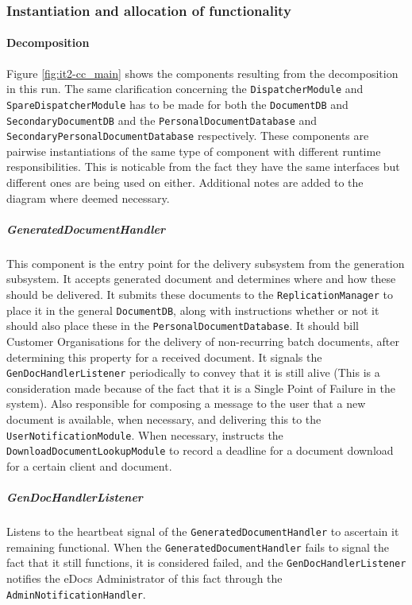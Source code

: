 \documentclass[a4paper,10pt]{article}
\begin{document}
\subsubsection{Instantiation and allocation of functionality}
\paragraph{Decomposition}
Figure \ref{fig:it2-cc_main} shows the components resulting from the decomposition in this run. The same clarification concerning the \texttt{DispatcherModule} and \texttt{SpareDispatcherModule} has to be made for both the \texttt{DocumentDB} and \texttt{SecondaryDocumentDB} and the \texttt{PersonalDocumentDatabase} and \texttt{SecondaryPersonalDocumentDatabase} respectively. These components are pairwise instantiations of the same type of component with different runtime responsibilities. This is noticable from the fact they have the same interfaces but different ones are being used on either. Additional notes are added to the diagram where deemed necessary.

\subparagraph{GeneratedDocumentHandler}
This component is the entry point for the delivery subsystem from the generation subsystem. It accepts generated document and determines where and how these should be delivered. It submits these documents to the \texttt{ReplicationManager} to place it in the general \texttt{DocumentDB}, along with instructions whether or not it should also place these in the \texttt{PersonalDocumentDatabase}. It should bill Customer Organisations for the delivery of non-recurring batch documents, after determining this property for a received document. It signals the \texttt{GenDocHandlerListener} periodically to convey that it is still alive (This is a consideration made because of the fact that it is a Single Point of Failure in the system). Also responsible for composing a message to the user that a new document is available, when necessary, and delivering this to the \texttt{UserNotificationModule}. When necessary, instructs the \texttt{DownloadDocumentLookupModule} to record a deadline for a document download for a certain client and document.

\subparagraph{GenDocHandlerListener}
Listens to the heartbeat signal of the \texttt{GeneratedDocumentHandler} to ascertain it remaining functional. When the \texttt{GeneratedDocumentHandler} fails to signal the fact that it still functions, it is considered failed, and the \texttt{GenDocHandlerListener} notifies the eDocs Administrator of this fact through the \texttt{AdminNotificationHandler}.
\end{document}
